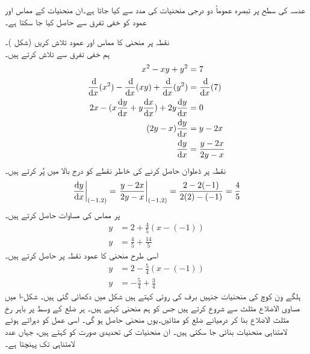 عدسہ کی سطح پر تبصرہ عموماً دو درجی منحنیات کی مدد سے کیا جاتا ہے۔ان منحنیات کے مماس اور عمود کو خفی تفرق سے حاصل کیا جا سکتا ہے۔

نقطہ  پر منحنی  کا مماس اور عمود تلاش کریں (شکل )۔\\
ہم خفی تفرق سے  تلاش کرتے ہیں۔
\begin{align*}
x^2-xy+y^2&=7\\
\frac{\dif}{\dif x}(x^2)-\frac{\dif}{\dif x}(xy)+\frac{\dif}{\dif x}(y^2)&=\frac{\dif}{\dif x}(7)\\
2x-(x\frac{\dif y}{\dif x}+y\frac{\dif x}{\dif x})+2y\frac{\dif y}{\dif x}&=0\\
(2y-x)\frac{\dif y}{\dif x}&=y-2x\\
\frac{\dif y}{\dif x}&=\frac{y-2x}{2y-x}
\end{align*}
نقطہ  پر ڈھلوان حاصل کرنے کی خاطر نقطے کو  درج بالا میں  پُر کرتے ہیں۔
\begin{align*}
\left.\frac{\dif y}{\dif x}\right|_{(-1,2)}=\left. \frac{y-2x}{2y-x}\right|_{(-1,2)}=\frac{2-2(-1)}{2(2)-(-1)}=\frac{4}{5}
\end{align*}
 پر مماس کی مساوات حاصل کرتے ہیں۔
\begin{align*}
y&=2+\frac{4}{5}(x-(-1))\\
y&=\frac{4}{5}+\frac{14}{5}
\end{align*}
اسی طرح منحنی کا عمود نقطہ  پر حاصل کرتے ہیں۔
\begin{align*}
y&=2-\frac{5}{4}(x-(-1))\\
y&=-\frac{5}{4}+\frac{3}{4}
\end{align*}
ہلگے ون کوچ کی  منحنیات جنہیں  برف کی روئی کہتے ہیں شکل  میں دکھائی  گئی ہیں۔ شکل-ا میں مساوی الاضلاع مثلث سے شروع کرتے ہیں جس کو ہم منحنی  کہتے ہیں۔ ہر ضلع کے وسط پر باہر رخ مثلث الاضلاع بنا کر درمیانے  ضلع کو مٹائیں۔یوں منحنی  حاصل ہو گی۔ اسی عمل کو دہراتے ہوئے لامتناہی منحنیات بنائی جا سکتی ہیں۔ ان منحنیات کی تحدیدی صورت  کو  کہتے ہیں، جہاں عدد  لامتناہی تک پہنچتا ہے۔

